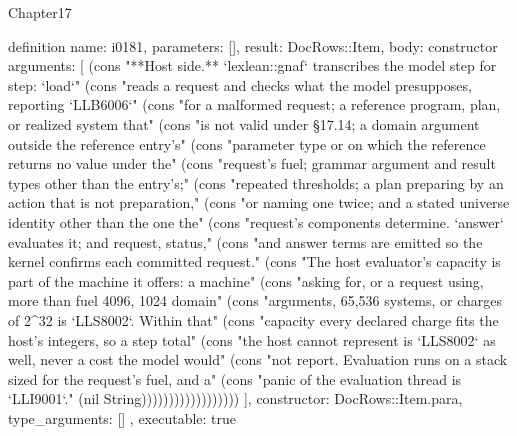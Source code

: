 \begin{lexlean}{Chapter17}
\begin{semanticmodule}
definition{
  name: i0181,
  parameters: [],
  result: DocRows::Item,
  body: constructor{
    arguments: [
      (cons "**Host side.** `lexlean::gnaf` transcribes the model step for step: `load`" (cons "reads a request and checks what the model presupposes, reporting `LLB6006`" (cons "for a malformed request; a reference program, plan, or realized system that" (cons "is not valid under §17.14; a domain argument outside the reference entry's" (cons "parameter type or on which the reference returns no value under the" (cons "request's fuel; grammar argument and result types other than the entry's;" (cons "repeated thresholds; a plan preparing by an action that is not preparation," (cons "or naming one twice; and a stated universe identity other than the one the" (cons "request's components determine. `answer` evaluates it; and request, status," (cons "and answer terms are emitted so the kernel confirms each committed request." (cons "The host evaluator's capacity is part of the machine it offers: a machine" (cons "asking for, or a request using, more than fuel 4096, 1024 domain" (cons "arguments, 65,536 systems, or charges of 2^32 is `LLS8002`. Within that" (cons "capacity every declared charge fits the host's integers, so a step total" (cons "the host cannot represent is `LLS8002` as well, never a cost the model would" (cons "not report. Evaluation runs on a stack sized for the request's fuel, and a" (cons "panic of the evaluation thread is `LLI9001`." (nil String))))))))))))))))))
    ],
    constructor: DocRows::Item.para,
    type_arguments: []
  },
  executable: true
}


\end{semanticmodule}
\end{lexlean}
